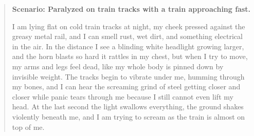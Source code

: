 \begin{quote}
\small
\textbf{Scenario: Paralyzed on train tracks with a train approaching fast.}

I am lying flat on cold train tracks at night, my cheek pressed against the greasy metal rail, and I can smell rust, wet dirt, and something electrical in the air. In the distance I see a blinding white headlight growing larger, and the horn blasts so hard it rattles in my chest, but when I try to move, my arms and legs feel dead, like my whole body is pinned down by invisible weight. The tracks begin to vibrate under me, humming through my bones, and I can hear the screaming grind of steel getting closer and closer while panic tears through me because I still cannot even lift my head. At the last second the light swallows everything, the ground shakes violently beneath me, and I am trying to scream as the train is almost on top of me.
\end{quote}


